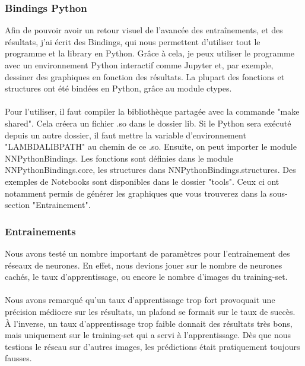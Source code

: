 \documentclass{article}
\begin{document}
\subsubsection{Bindings Python}
Afin de pouvoir avoir un retour visuel de l’avancée des entraînements, et des résultats, j’ai écrit des Bindings, qui nous permettent d’utiliser tout le programme et la library en Python. Grâce à cela, je peux utiliser le programme avec un environnement Python interactif comme Jupyter et, par exemple, dessiner des graphiques en fonction des résultats.
La plupart des fonctions et structures ont été bindées en Python, grâce au module ctypes.
\paragraph{}Pour l’utiliser, il faut compiler la bibliothèque partagée avec la commande "make shared".
Cela créera un fichier .so dans le dossier lib.
Si le Python sera exécuté depuis un autre dossier, il faut mettre la variable d’environnement "LAMBDALIBPATH" au chemin de ce .so.
Ensuite, on peut importer le module NNPythonBindings.
Les fonctions sont définies dans le module NNPythonBindings.core, les structures dans NNPythonBindings.structures.
Des exemples de Notebooks sont disponibles dans le dossier "tools". Ceux ci ont notamment permis de générer les graphiques que vous trouverez dans la sous-section "Entrainement".



\subsubsection{Entrainements}
Nous avons testé un nombre important de paramètres pour l’entrainement des réseaux de neurones. En effet, nous devions jouer sur le nombre de neurones cachés, le taux d’apprentissage, ou encore le nombre d’images du training-set.
\paragraph{}Nous avons remarqué qu’un taux d’apprentissage trop fort provoquait une précision médiocre sur les résultats, un plafond se formait sur le taux de succès. À l’inverse, un taux d’apprentissage trop faible donnait des résultats très bons, mais uniquement sur le training-set qui a servi à l’apprentissage. Dès que nous testions le réseau sur d’autres images, les prédictions était pratiquement toujours fausses. 
\end{document}
